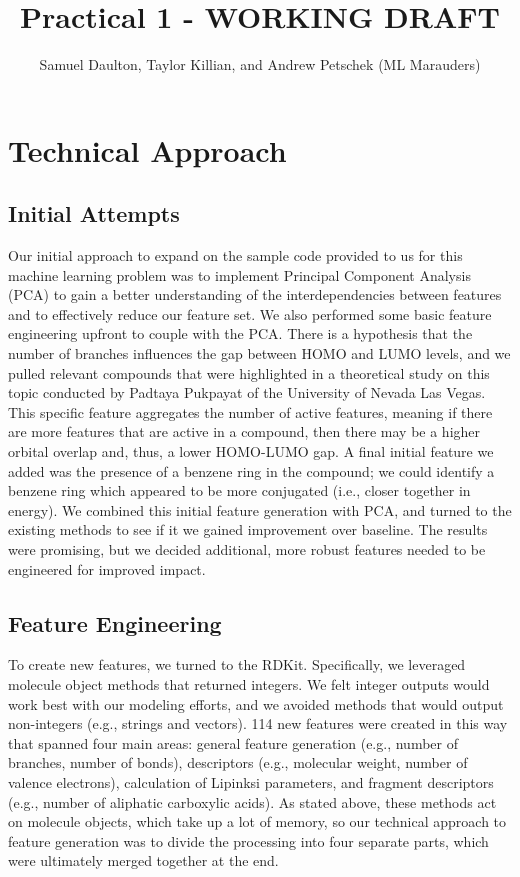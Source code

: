 \documentclass[11pt, oneside]{article}   	%
\title{Practical 1 - WORKING DRAFT}
\author{Samuel Daulton, Taylor Killian, and Andrew Petschek (ML Marauders)}
\begin{document}
\maketitle
\section{Technical Approach}
\subsection{Initial Attempts} 


Our initial approach to expand on the sample code provided to us for this machine learning problem was to implement Principal Component Analysis (PCA) to gain a better understanding of the interdependencies between features and to effectively reduce our feature set. We also performed some basic feature engineering upfront to couple with the PCA. There is a hypothesis that the number of branches influences the gap between HOMO and LUMO levels, and we pulled relevant compounds that were highlighted in a theoretical study on this topic conducted by Padtaya Pukpayat of the University of Nevada Las Vegas. This specific feature aggregates the number of active features, meaning if there are more features that are active in a compound, then there may be a higher orbital overlap and, thus, a lower HOMO-LUMO gap. A final initial feature we added was the presence of a benzene ring in the compound; we could identify a benzene ring which appeared to be more conjugated (i.e., closer together in energy). We combined this initial feature generation with PCA, and turned to the existing methods to see if it we gained improvement over baseline. The results were promising, but we decided additional, more robust features needed to be engineered for improved impact. 

\subsection{Feature Engineering} 

To create new features, we turned to the RDKit. Specifically, we leveraged molecule object methods that returned integers. We felt integer outputs would work best with our modeling efforts, and we avoided methods that would output non-integers (e.g., strings and vectors). 114 new features were created in this way that spanned four main areas: general feature generation (e.g., number of branches, number of bonds), descriptors (e.g., molecular weight, number of valence electrons), calculation of Lipinksi parameters, and fragment descriptors (e.g., number of aliphatic carboxylic acids). As stated above, these methods act on molecule objects, which take up a lot of memory, so our technical approach to feature generation was to divide the processing into four separate parts, which were ultimately merged together at the end. 
\end{document}
